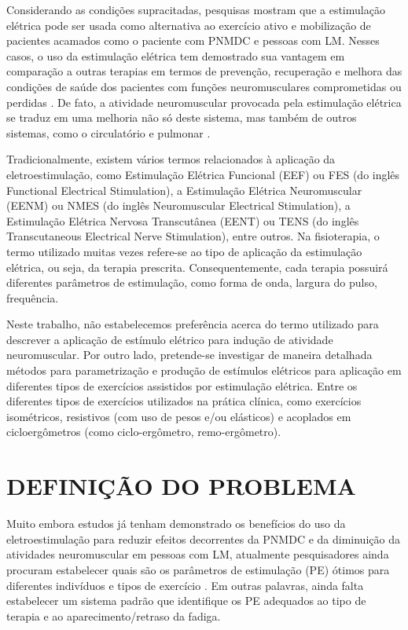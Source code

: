 Considerando as condições supracitadas, pesquisas mostram que a estimulação elétrica pode ser usada como alternativa ao exercício ativo e mobilização de pacientes acamados como o paciente com \acrshort{PNMDC} e pessoas com \acrshort{LM}. Nesses casos, o uso da estimulação elétrica tem demostrado sua vantagem em comparação a outras terapias em termos de prevenção, recuperação e melhora das condições de saúde dos pacientes com funções neuromusculares comprometidas ou perdidas \cite{Faria2006ImplementacaoMedulares, Silva2016SafetyStudy.,Deley2005ComparisonFailure.,Zanotti2003PeripheralStimulation, Naki2011IsParameters}. De fato, a atividade neuromuscular provocada pela estimulação elétrica se traduz em uma melhoria não só deste sistema, mas também de outros sistemas, como o circulatório e pulmonar \cite{Ferreira2014NeuromuscularReview}. 

Tradicionalmente, existem vários termos relacionados à aplicação da eletroestimulação, como Estimulação Elétrica Funcional (\acrshort{EEF}) ou \acrshort{FES} (do inglês Functional Electrical Stimulation), a Estimulação Elétrica Neuromuscular (\acrshort{EENM}) ou \acrshort{NMES} (do inglês Neuromuscular Electrical Stimulation), a Estimulação Elétrica Nervosa Transcutânea (\acrshort{EENT}) ou \acrshort{TENS} (do inglês Transcutaneous Electrical Nerve Stimulation), entre outros. Na fisioterapia, o termo utilizado muitas vezes refere-se ao tipo de aplicação da estimulação elétrica, ou seja, da terapia prescrita. Consequentemente, cada terapia possuirá diferentes parâmetros de estimulação, como forma de onda, largura do pulso, frequência.

Neste trabalho, não estabelecemos preferência acerca do termo utilizado para descrever a aplicação de estímulo elétrico para indução de atividade neuromuscular. Por outro lado, pretende-se investigar de maneira detalhada métodos para parametrização e produção de estímulos elétricos para aplicação em diferentes tipos de exercícios assistidos por estimulação elétrica. Entre os diferentes tipos de exercícios utilizados na prática clínica, como exercícios isométricos, resistivos (com uso de pesos e/ou elásticos) e acoplados em cicloergômetros (como ciclo-ergômetro, remo-ergômetro).

\section{DEFINIÇÃO DO PROBLEMA}

Muito embora estudos já tenham demonstrado os benefícios do uso da eletroestimulação para reduzir efeitos decorrentes da \acrshort{PNMDC} e da diminuição da atividades neuromuscular em pessoas com \acrshort{LM}, atualmente pesquisadores ainda procuram estabelecer quais são os parâmetros de estimulação (\acrshort{PE}) ótimos para diferentes indivíduos e tipos de exercício \cite{Silva2016SafetyStudy.}. Em outras palavras, ainda falta estabelecer um sistema padrão que identifique os \acrshort{PE} adequados ao tipo de terapia e ao aparecimento/retraso da fadiga.

